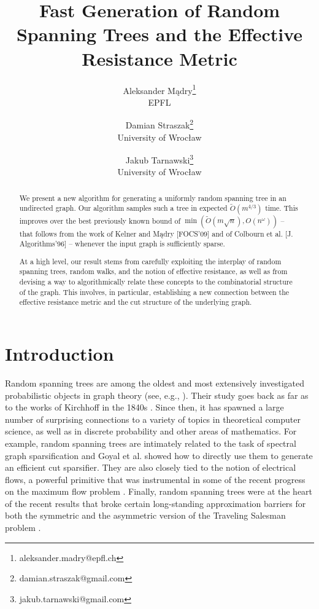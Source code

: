 \documentclass[11pt, letterpaper]{article}
\newcommand{\tO}{\widetilde{O}}
\begin{document}
\title{Fast Generation of Random Spanning Trees and the Effective Resistance Metric}

\author{ Aleksander Mądry\thanks{aleksander.madry@epfl.ch} \\ EPFL \and Damian Straszak\thanks{damian.straszak@gmail.com} \\ University of Wrocław\and Jakub Tarnawski\thanks{jakub.tarnawski@gmail.com} \\ University of Wrocław}

\date{}
 
\maketitle

\begin{abstract}
We present a new algorithm for generating a uniformly random spanning tree in an undirected graph. Our algorithm samples such a tree in expected $\tO(m^{4/3})$ time. This improves over the best previously known bound of $\min(\tO(m\sqrt{n}),O(n^{\omega}))$ -- that follows from the work of Kelner and Mądry [FOCS'09] and of Colbourn et al. [J. Algorithms'96] -- whenever the input graph is sufficiently sparse.

At a high level, our result stems from carefully exploiting the interplay of random spanning trees, random walks, and the notion of effective resistance, as well as from devising a way to algorithmically relate these concepts to the combinatorial structure of the graph. This involves, in particular, establishing a new connection between the effective resistance metric and the cut structure of the underlying graph.  
\end{abstract}







\section{Introduction}\label{sec:introduction}

Random spanning trees are among the oldest and most extensively investigated probabilistic objects in graph theory (see, e.g., \cite{LyonsP13}). Their study goes back as far as to the works of Kirchhoff in the 1840s \cite{Kirchhoff47}. Since then, it has spawned a large number of surprising connections to a variety of topics in theoretical computer science, as well as in discrete probability and other areas of mathematics. For example, random spanning trees are intimately related to the task of spectral graph sparsification \cite{SpielmanS08,BatsonSS09} and Goyal et al. \cite{GoyalRV09} showed how to directly use them to generate an efficient cut sparsifier. They are also closely tied to the notion of electrical flows, a powerful primitive that was instrumental in some of the recent progress on the maximum flow problem \cite{ChristianoKMST11,Madry13}. Finally, random spanning trees were at the heart of the recent results that broke certain long-standing approximation barriers for both the symmetric and the asymmetric version of the Traveling Salesman problem \cite{AsadpourGMOS10,OveisGharanSS11}. 
\end{document}
